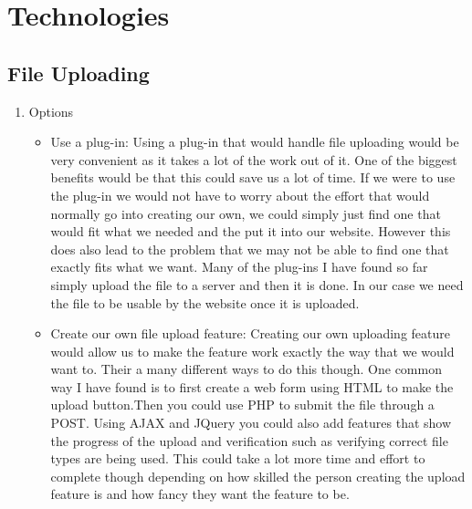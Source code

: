 \documentclass[letterpaper, 10pt, draftclsnofoot, compsoc, onecolumn]{IEEEtran}
\begin{document}
\section{Technologies}

	\subsection{File Uploading}
		\begin{enumerate}
			\item{Options}
				\begin{itemize}
					\item  Use a plug-in: Using a plug-in that would handle file uploading would be very convenient as it takes a lot
						of the work out of it. One of the  biggest benefits would be that this could save us a lot of time. If we were to use
						the plug-in we would not have to worry about the effort that would normally go into creating our own, we could simply just
						find one that would fit  what we needed and the put it into our website. However this does also lead to the problem that we
						may not be able to find one that exactly fits what we want. Many of the plug-ins I have found so far simply upload the file to
						a server and then it is done. In our case we need the file to be usable by the website once it is uploaded.
 
					\item  Create our own file upload feature: Creating our own uploading feature would allow us to make the feature 
						work exactly the way that we would want to. Their a many different ways to do this though. One common way I have found 
						is to first create a web form using HTML to make the upload button.Then you could use PHP to submit the file through a POST.
						Using AJAX and JQuery you could also add features that show the progress of the upload and verification such as verifying correct 
						file types are being used. This could take a lot more time and effort to complete though depending on how skilled the person creating 
						the upload feature is and how fancy they want the feature to be.      


\end{itemize}
\end{enumerate}
\end{document}
